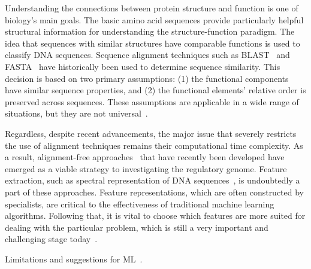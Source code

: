 Understanding the connections between protein structure and function is one of biology's main goals. The basic amino acid sequences provide particularly helpful structural information for understanding the structure-function paradigm. The idea that sequences with similar structures have comparable functions is used to classify DNA sequences. Sequence alignment techniques such as BLAST~\cite{Altschul1990BasicTool} and FASTA~\cite{Pearson1988ImprovedComparison} have historically been used to determine sequence similarity. This decision is based on two primary assumptions: (1) the functional components have similar sequence properties, and (2) the functional elements' relative order is preserved across sequences. These assumptions are applicable in a wide range of situations, but they are not universal~\cite{LoBosco2017DeepClassification}.

Regardless, despite recent advancements, the major issue that severely restricts the use of alignment techniques remains their computational time complexity. As a result, alignment-free approaches~\cite{Vinga2003Alignment-freeReview,Pinello2014ApplicationsEpigenomics} that have recently been developed have emerged as a viable strategy to investigating the regulatory genome. Feature extraction, such as spectral representation of DNA sequences~\cite{LoBosco2014ASequences,LoBosco2015AlignmentClassification}, is undoubtedly a part of these approaches. Feature representations, which are often constructed by specialists, are critical to the effectiveness of traditional machine learning algorithms. Following that, it is vital to choose which features are more suited for dealing with the particular problem, which is still a very important and challenging stage today~\cite{LoBosco2017DeepClassification}.

Limitations and suggestions for \gls{ML}~\cite{Abd-Alhalem2021DNASurvey}.

